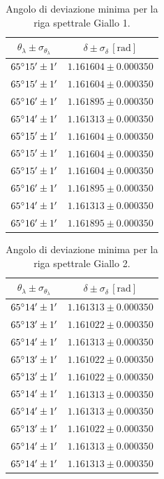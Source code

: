 \documentclass[]{article}
\begin{document}
    \begin{table}[H]
        \centering
        \begin{tabular}{||c|c||}
            \hline
            $\theta_{\lambda} \pm \sigma_{\theta_{\lambda}}$ & $\delta \pm \sigma_{\delta} \,\left[\text{rad}\right]$ \\\hline
            \hline
            $65\degree 15' \pm 1'$ & $1.161604 \pm 0.000350$ \\\hline
            $65\degree 15' \pm 1'$ & $1.161604 \pm 0.000350$ \\\hline
            $65\degree 16' \pm 1'$ & $1.161895 \pm 0.000350$ \\\hline
            $65\degree 14' \pm 1'$ & $1.161313 \pm 0.000350$ \\\hline
            $65\degree 15' \pm 1'$ & $1.161604 \pm 0.000350$ \\\hline
            $65\degree 15' \pm 1'$ & $1.161604 \pm 0.000350$ \\\hline
            $65\degree 15' \pm 1'$ & $1.161604 \pm 0.000350$ \\\hline
            $65\degree 16' \pm 1'$ & $1.161895 \pm 0.000350$ \\\hline
            $65\degree 14' \pm 1'$ & $1.161313 \pm 0.000350$ \\\hline
            $65\degree 16' \pm 1'$ & $1.161895 \pm 0.000350$ \\\hline
        \end{tabular}
        \caption{Angolo di deviazione minima per la riga spettrale Giallo 1.}
        \label{giallo-1}
    \end{table}

    \begin{table}[H]
        \centering
        \begin{tabular}{||c|c||}
            \hline
            $\theta_{\lambda} \pm \sigma_{\theta_{\lambda}}$ & $\delta \pm \sigma_{\delta} \,\left[\text{rad}\right]$ \\\hline
            \hline
            $65\degree 14' \pm 1'$ & $1.161313 \pm 0.000350$ \\\hline
            $65\degree 13' \pm 1'$ & $1.161022 \pm 0.000350$ \\\hline
            $65\degree 14' \pm 1'$ & $1.161313 \pm 0.000350$ \\\hline
            $65\degree 13' \pm 1'$ & $1.161022 \pm 0.000350$ \\\hline
            $65\degree 13' \pm 1'$ & $1.161022 \pm 0.000350$ \\\hline
            $65\degree 14' \pm 1'$ & $1.161313 \pm 0.000350$ \\\hline
            $65\degree 14' \pm 1'$ & $1.161313 \pm 0.000350$ \\\hline
            $65\degree 13' \pm 1'$ & $1.161022 \pm 0.000350$ \\\hline
            $65\degree 14' \pm 1'$ & $1.161313 \pm 0.000350$ \\\hline
            $65\degree 14' \pm 1'$ & $1.161313 \pm 0.000350$ \\\hline
        \end{tabular}
        \caption{Angolo di deviazione minima per la riga spettrale Giallo 2.}
        \label{giallo-2}
    \end{table}
\end{document}

